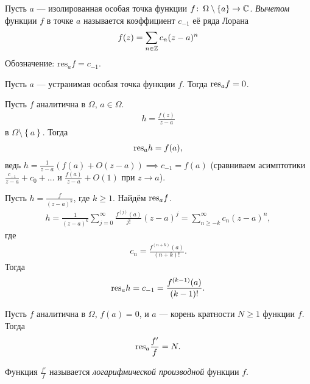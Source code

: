 \documentclass[../complex-analysis.tex]{subfiles}
\begin{document}
\begin{df}
 Пусть $ a $ --- изолированная особая точка функции $ f \colon\, \Omega \setminus \left\{ a \right\} \to \mathbb{C}$. \textit{Вычетом} функции $ f $ в точке $ a $ называется коэффициент $ c_{-1} $ её ряда Лорана
 \begin{align*}
  f(z) = \sum_{n \in \mathbb{Z}} c_n (z-a)^{n}
 \end{align*} Обозначение: $ \mathrm{res}_a f = c_{-1} $.
\end{df}
\begin{exmpl*}
 Пусть $ a $ --- устранимая особая точка функции $ f $. Тогда $ \mathrm{res}_a f = 0 $.
\end{exmpl*}
\begin{exmpl*}
 Пусть $ f $ аналитична в $ \Omega $, $ a \in \Omega $.
 \begin{align*}
  h = \frac{f(z)}{z - a}
 \end{align*} в $ \Omega \setminus \left\{ a \right\} $. Тогда 
 \begin{align*}
  \mathrm{res}_a h = f(a),
 \end{align*} ведь $ h = \frac{1}{z-a}(f(a)+O(z-a)) \implies c_{-1} = f(a) $ (сравниваем асимптотики $ \frac{c_{-1}}{z-a} + c_0 + \ldots $ и $ \frac{f(a)}{z-a} + O(1) $ при $ z\to a $).
\end{exmpl*}
\begin{exmpl*}
 Пусть $ h = \frac{f}{(z-a)^{k}} $, где $ k \geqslant 1 $. Найдём $ \mathrm{res}_a f $.
 \begin{align*}
 h = \frac{1}{(z-a)^{k}}\sum_{j=0}^{\infty} \frac{f^{(j)}(a)}{j!}(z-a)^{j} = \sum_{n \geqslant -k}^{\infty} c_n(z-a)^{n},
 \end{align*} где
 \begin{align*}
  c_n = \frac{f^{(n+k)}(a)}{(n+k)!}.
 \end{align*} Тогда
 \begin{align*}
  \mathrm{res}_a h = c_{-1} = \frac{f^{(k-1)}(a)}{(k-1)!}.
 \end{align*}
\end{exmpl*}
\begin{exmpl}
 \label{example:logarithmic_derivative1}
 Пусть $ f $ аналитична в $ \Omega $, $ f(a) = 0 $, и $ a $ --- корень кратности $ N \geqslant 1$ функции $ f $. Тогда
 \begin{align*}
  \mathrm{res}_a \frac{f'}{f} = N.
 \end{align*}

 Функция $ \frac{f'}{f} $  называется \textit{логарифмической производной} функции $ f $.
\end{exmpl}
\end{document}
